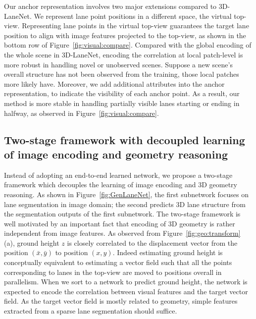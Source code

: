 \documentclass[10pt,twocolumn,letterpaper]{article}
\begin{document}
Our anchor representation involves two major extensions compared to 3D-LaneNet. We represent lane point positions in a different space, the virtual top-view. Representing lane points in the virtual top-view guarantees the target lane position to align with image features projected to the top-view, as shown in the bottom row of Figure~\ref{fig:visual:compare}. Compared with the global encoding of the whole scene in 3D-LaneNet, encoding the correlation at local patch-level is more robust in handling novel or unobserved scenes. Suppose a new scene's overall structure has not been observed from the training, those local patches more likely have. Moreover, we add additional attributes into the anchor representation, to indicate the visibility of each anchor point. As a result, our method is more stable in handling partially visible lanes starting or ending in halfway, as observed in Figure~\ref{fig:visual:compare}.









\subsection{Two-stage framework with decoupled learning of image encoding and geometry reasoning}
\label{sec:two:stage}


Instead of adopting an end-to-end learned network, we propose a two-stage framework which decouples the learning of image encoding and 3D geometry reasoning. As shown in Figure~\ref{fig:GenLaneNet}, the first subnetwork focuses on lane segmentation in image domain; the second predicts 3D lane structure from the segmentation outputs of the first subnetwork. The two-stage framework is well motivated by an important fact that encoding of 3D geometry is rather independent from image features. As observed from Figure~\ref{fig:geo:transform} (a), ground height $z$ is closely correlated to the displacement vector from the position $(\bar{x}, \bar{y})$ to position $(x, y)$. Indeed estimating ground height is conceptually equivalent to estimating a vector field such that all the points corresponding to lanes in the top-view are moved to positions overall in parallelism. When we sort to a network to predict ground height, the network is expected to encode the correlation between visual features and the target vector field. As the target vector field is mostly related to geometry, simple features extracted from a sparse lane segmentation should suffice. 
\end{document}
